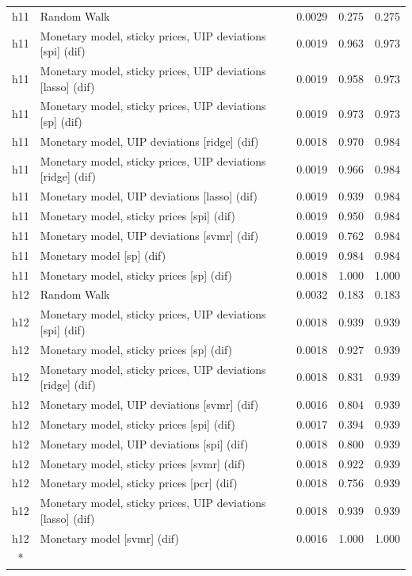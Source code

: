 \begin{ThreePartTable}
\begin{longtable}[t]{cp{5.5cm}ccc}
\addlinespace
h11 & \raggedright Random Walk & 0.0029 & 0.275 & 0.275\\
h11 & \raggedright Monetary model, sticky prices, UIP deviations [spi] (dif) & 0.0019 & 0.963 & 0.973\\
h11 & \raggedright Monetary model, sticky prices, UIP deviations [lasso] (dif) & 0.0019 & 0.958 & 0.973\\
h11 & \raggedright Monetary model, sticky prices, UIP deviations [sp] (dif) & 0.0019 & 0.973 & 0.973\\
h11 & \raggedright Monetary model, UIP deviations [ridge] (dif) & 0.0018 & 0.970 & 0.984\\
h11 & \raggedright Monetary model, sticky prices, UIP deviations [ridge] (dif) & 0.0019 & 0.966 & 0.984\\
h11 & \raggedright Monetary model, UIP deviations [lasso] (dif) & 0.0019 & 0.939 & 0.984\\
h11 & \raggedright Monetary model, sticky prices [spi] (dif) & 0.0019 & 0.950 & 0.984\\
h11 & \raggedright Monetary model, UIP deviations [svmr] (dif) & 0.0019 & 0.762 & 0.984\\
h11 & \raggedright Monetary model [sp] (dif) & 0.0019 & 0.984 & 0.984\\
h11 & \raggedright Monetary model, sticky prices [sp] (dif) & 0.0018 & 1.000 & 1.000\\
\addlinespace
h12 & \raggedright Random Walk & 0.0032 & 0.183 & 0.183\\
h12 & \raggedright Monetary model, sticky prices, UIP deviations [spi] (dif) & 0.0018 & 0.939 & 0.939\\
h12 & \raggedright Monetary model, sticky prices [sp] (dif) & 0.0018 & 0.927 & 0.939\\
h12 & \raggedright Monetary model, sticky prices, UIP deviations [ridge] (dif) & 0.0018 & 0.831 & 0.939\\
h12 & \raggedright Monetary model, UIP deviations [svmr] (dif) & 0.0016 & 0.804 & 0.939\\
h12 & \raggedright Monetary model, sticky prices [spi] (dif) & 0.0017 & 0.394 & 0.939\\
h12 & \raggedright Monetary model, UIP deviations [spi] (dif) & 0.0018 & 0.800 & 0.939\\
h12 & \raggedright Monetary model, sticky prices [svmr] (dif) & 0.0018 & 0.922 & 0.939\\
h12 & \raggedright Monetary model, sticky prices [pcr] (dif) & 0.0018 & 0.756 & 0.939\\
h12 & \raggedright Monetary model, sticky prices, UIP deviations [lasso] (dif) & 0.0018 & 0.939 & 0.939\\
h12 & \raggedright Monetary model [svmr] (dif) & 0.0016 & 1.000 & 1.000\\*
\end{longtable}
\end{ThreePartTable}
\endgroup{}
